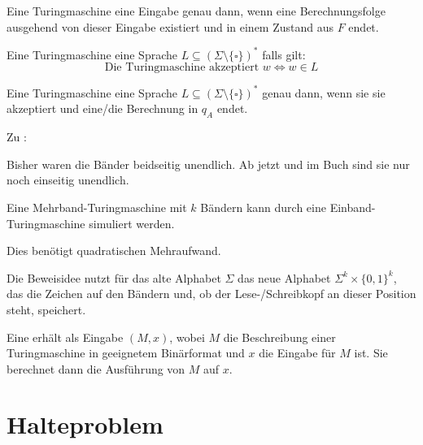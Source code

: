 Eine Turingmaschine  eine Eingabe genau dann, wenn eine Berechnungsfolge ausgehend von dieser Eingabe existiert und in einem Zustand aus $F$ endet.

Eine Turingmaschine  eine Sprache $L \subseteq \left( \Sigma \setminus \{\square\} \right)^\ast$ falls gilt: 
$$ \text{Die Turingmaschine akzeptiert } w \Leftrightarrow w \in L $$

Eine Turingmaschine  eine Sprache $L \subseteq \left( \Sigma \setminus \{\square\} \right)^\ast$ genau dann, wenn sie sie akzeptiert und eine/die Berechnung in $q_A$ endet.















Zu :

Bisher waren die Bänder beidseitig unendlich. Ab jetzt und im Buch sind sie nur noch einseitig unendlich.



\begin{satz}
    Eine Mehrband-Turingmaschine mit $k$ Bändern kann durch eine Einband-Turingmaschine simuliert werden.

    Dies benötigt quadratischen Mehraufwand.
\end{satz}

\begin{beweis}
    Die Beweisidee nutzt für das alte Alphabet $\Sigma$ das neue Alphabet $\Sigma^k \times \{0,1\}^k$, das die Zeichen auf den Bändern und, ob der Lese-/Schreibkopf an dieser Position steht, speichert.
\end{beweis}



\begin{definition}
    Eine  erhält als Eingabe $(M, x)$, wobei $M$ die Beschreibung einer Turingmaschine in geeignetem Binärformat und $x$ die Eingabe für $M$ ist.
    Sie berechnet dann die Ausführung von $M$ auf $x$.
\end{definition}




\section{Halteproblem}


